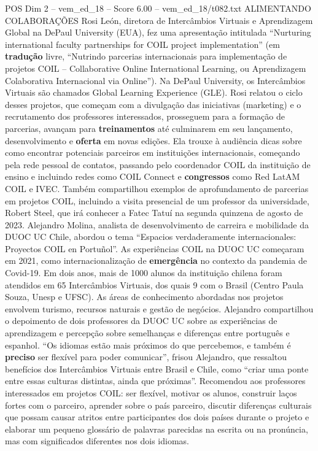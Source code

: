 \begin{textsample}{POS Dim 2 – vem\_ed\_18 – Score 6.00 – vem\_ed\_18/t082.txt}  \label{ex:f2_pos_082}
ALIMENTANDO COLABORAÇÕES Rosi León, diretora de Intercâmbios Virtuais e Aprendizagem Global na DePaul University (EUA), fez uma apresentação intitulada “Nurturing international faculty partnerships for COIL project implementation” (em \textbf{tradução} livre, “Nutrindo parcerias internacionais para implementação de projetos COIL – Collaborative Online International Learning, ou Aprendizagem Colaborativa Internacional via Online”).
Na DePaul University, os Intercâmbios Virtuais são chamados Global Learning Experience (GLE).
Rosi relatou o ciclo desses projetos, que começam com a divulgação das iniciativas (marketing) e o recrutamento dos professores interessados, prosseguem para a formação de parcerias, avançam para \textbf{treinamentos} até culminarem em seu lançamento, desenvolvimento e \textbf{oferta} em novas edições.
Ela trouxe à audiência dicas sobre como encontrar potenciais parceiros em instituições internacionais, começando pela rede pessoal de contatos, passando pelo coordenador COIL da instituição de ensino e incluindo redes como COIL Connect e \textbf{congressos} como Red LatAM COIL e IVEC.
Também compartilhou exemplos de aprofundamento de parcerias em projetos COIL, incluindo a visita presencial de um professor da universidade, Robert Steel, que irá conhecer a Fatec Tatuí na segunda quinzena de agosto de 2023.
Alejandro Molina, analista de desenvolvimento de carreira e mobilidade da DUOC UC Chile, abordou o tema “Espacios verdaderamente internacionales: Proyectos COIL en Portuñol”.
As experiências COIL na DUOC UC começaram em 2021, como internacionalização de \textbf{emergência} no contexto da pandemia de Covid-19.
Em dois anos, mais de 1000 alunos da instituição chilena foram atendidos em 65 Intercâmbios Virtuais, dos quais 9 com o Brasil (Centro Paula Souza, Unesp e UFSC).
As áreas de conhecimento abordadas nos projetos envolvem turismo, recursos naturais e gestão de negócios.
Alejandro compartilhou o depoimento de dois professores da DUOC UC sobre as experiências de aprendizagem e percepção sobre semelhanças e diferenças entre português e espanhol. “Os idiomas estão mais próximos do que percebemos, e também é \textbf{preciso} ser flexível para poder comunicar”, frisou Alejandro, que ressaltou benefícios dos Intercâmbios Virtuais entre Brasil e Chile, como “criar uma ponte entre essas culturas distintas, ainda que próximas”.
Recomendou aos professores interessados em projetos COIL: ser flexível, motivar os alunos, construir laços fortes com o parceiro, aprender sobre o país parceiro, discutir diferenças culturais que possam causar atritos entre participantes dos dois países durante o projeto e elaborar um pequeno glossário de palavras parecidas na escrita ou na pronúncia, mas com significados diferentes nos dois idiomas.

\end{textsample}
